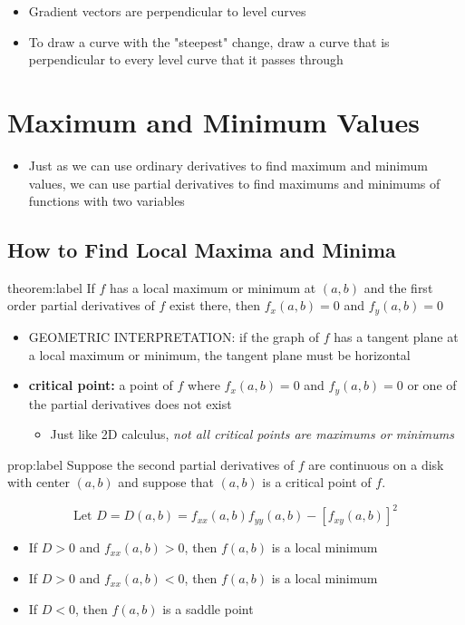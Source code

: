 \documentclass{package/notes}
\begin{document}
\begin{itemize}
	\item Gradient vectors are perpendicular to level curves
	\item To draw a curve with the "steepest" change, draw a curve that is perpendicular to every level curve that it passes through
\end{itemize}



\section{Maximum and Minimum Values}

\begin{itemize}
	\item Just as we can use ordinary derivatives to find maximum and minimum values, we can use partial derivatives to find maximums and minimums of functions with two variables
\end{itemize}


\subsection{How to Find Local Maxima and Minima}

\begin{theorem}{theorem:label}
	If $f$ has a local maximum or minimum at $(a,b)$ and the first order partial derivatives of $f$ exist there, then $f_x(a,b) = 0$ and $f_y(a,b) = 0$ 
\end{theorem}

\begin{itemize}
	\item GEOMETRIC INTERPRETATION: if the graph of $f$ has a tangent plane at a local maximum or minimum, the tangent plane must be horizontal
	\item \textbf{critical point:} a point of $f$ where $f_x(a,b) = 0$ and $f_y(a,b) = 0$ or one of the partial derivatives does not exist
	\begin{itemize}
		\item Just like 2D calculus, \textit{not all critical points are maximums or minimums}
	\end{itemize}
\end{itemize}

\begin{proposition}{prop:label}
	Suppose the second partial derivatives of $f$ are continuous on a disk with center $(a,b)$ and suppose that $(a,b)$ is a critical point of $f$.
	
	$$\text{Let } D =D(a,b)=f_{xx}(a,b)f_{yy}(a,b)-[f_{xy}(a,b)]^2$$

	\begin{itemize}
		\item If $D > 0$ and $f_{xx}(a,b) > 0$, then $f(a,b)$ is a local minimum
		\item If $D > 0$ and $f_{xx}(a,b) < 0$, then $f(a,b)$ is a local minimum
		\item If $D <0$, then $f(a,b)$ is a saddle point
	\end{itemize}
\end{proposition}
\end{document}

